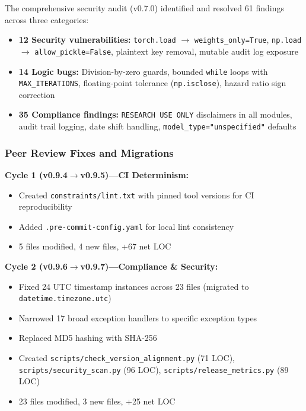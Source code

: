The comprehensive security audit (v0.7.0) identified and resolved 61 findings across three categories:
\begin{itemize}
  \item \textbf{12 Security vulnerabilities:} \texttt{torch.load} $\to$ \texttt{weights\_only=True}, \texttt{np.load} $\to$ \texttt{allow\_pickle=False}, plaintext key removal, mutable audit log exposure
  \item \textbf{14 Logic bugs:} Division-by-zero guards, bounded \texttt{while} loops with \texttt{MAX\_ITERATIONS}, floating-point tolerance (\texttt{np.isclose}), hazard ratio sign correction
  \item \textbf{35 Compliance findings:} \texttt{RESEARCH USE ONLY} disclaimers in all modules, audit trail logging, date shift handling, \texttt{model\_type="unspecified"} defaults
\end{itemize}

\subsubsection{Peer Review Fixes and Migrations}

\textbf{Cycle 1 (v0.9.4$\to$v0.9.5)---CI Determinism:}
\begin{itemize}
  \item Created \texttt{constraints/lint.txt} with pinned tool versions for CI reproducibility
  \item Added \texttt{.pre-commit-config.yaml} for local lint consistency
  \item 5 files modified, 4 new files, +67 net LOC
\end{itemize}

\textbf{Cycle 2 (v0.9.6$\to$v0.9.7)---Compliance \& Security:}
\begin{itemize}
  \item Fixed 24 UTC timestamp instances across 23 files (migrated to \texttt{datetime.timezone.utc})
  \item Narrowed 17 broad exception handlers to specific exception types
  \item Replaced MD5 hashing with SHA-256
  \item Created \texttt{scripts/check\_version\_alignment.py} (71 LOC), \texttt{scripts/security\_scan.py} (96 LOC), \texttt{scripts/release\_metrics.py} (89 LOC)
  \item 23 files modified, 3 new files, +25 net LOC
\end{itemize}

